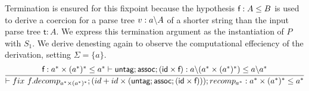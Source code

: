 \documentclass[a4paper,UKenglish,cleveref, autoref, thm-restate]{lipics-v2021}
\begin{document}
\begin{example}[Grabmeyer]
Termination is ensured for this fixpoint because the hypothesis $\textsf{f} : A \leq B$ is used to derive a coercion for a parse tree $ \mathsf{v} : \derive{a}{A}$ of a shorter string than the input parse tree $\mathsf{t} : A$.
We express this termination argument as the instantiation of $P$ with $S_1$. We derive denesting again to observe the computational effeciency of the derivation, setting $\Sigma = \{a\}$.
\[\infer{\contains{}{\fix ~f.decomp_{a^* \times (a^*)^*};(id +  id\times  (\dslcom{untag} ; \dslcom{assoc} ; (\dslcom{id} \times \dslcom{f}))); recomp_{a^*}}{a^* \times (a^*)^*}{a^*}}{\contains{\dslcom{f} : a^* \times (a^*)^* \leq a^*}{\dslcom{untag} ; \dslcom{assoc} ; (\dslcom{id} \times \dslcom{f})}{\derive{a}{(a^* \times (a^*)^*)}}{\derive{a}{a^*}}} \]


\end{example}
\end{document}
